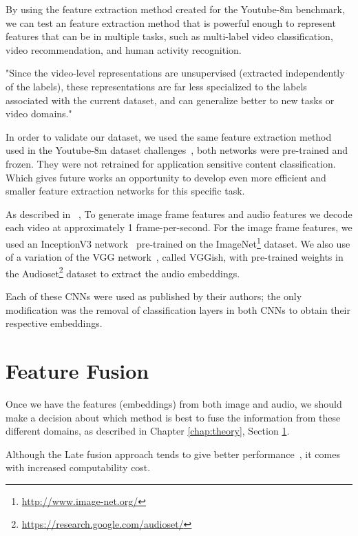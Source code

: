 By using the feature extraction method created for the Youtube-8m benchmark, we can test an feature extraction method that is powerful enough to represent features that can be in multiple tasks, such as multi-label video classification, video recommendation, and human activity recognition.

"Since the video-level representations are unsupervised (extracted independently of the labels), these representations are far less specialized to the labels associated with the current dataset, and can generalize better to new tasks or video domains."~\cite{abu2016youtube}

In order to validate our dataset, we used the same feature extraction method used in the Youtube-8m dataset challenges~\cite{abu2016youtube}, both networks were pre-trained and frozen. They were not retrained for application sensitive content classification. Which gives future works an opportunity to develop even more efficient and smaller feature extraction networks for this specific task.


As described in ~\cite{abu2016youtube},
To generate image frame features and audio features we decode each video at approximately 1 frame-per-second. For the image frame features, we used an InceptionV3  network~\cite{szegedy2016rethinking} pre-trained on the ImageNet\footnote{\url{http://www.image-net.org/}} dataset. We also use of a variation of the VGG network~\cite{simonyan2014VGG}, called VGGish, with pre-trained weights in the Audioset\footnote{\url{https://research.google.com/audioset/}} dataset to extract the audio embeddings.

Each of these CNNs were used as published by their authors; the only modification was the removal of classification layers in both CNNs to obtain their respective embeddings.

\section{Feature Fusion}
\label{sec:feature_fusion}

Once we have the features (embeddings) from both image and audio, we should make a decision about which method is best to fuse the information from these different domains, as described in Chapter \ref{chap:theory}, Section \ref{sec:feature_fusion}.

Although the Late fusion approach tends to give better performance~\cite{snoek2005featurefusion}, it comes with increased computability cost.

